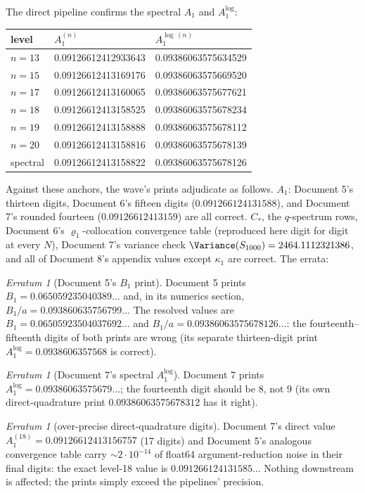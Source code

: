 \documentclass[11pt,oneside]{article}
\theoremstyle{definition}
\theoremstyle{remark}
\newtheorem{erratum}[theorem]{Erratum}
\begin{document}
The direct pipeline confirms the spectral $A_1$ and $A_1^{\log}$:
\begin{center}
\small
\begin{tabular}{@{}lll@{}}
\toprule
level & $A_1^{(n)}$ & $A_1^{\log\,(n)}$ \\
\midrule
$n=13$ & 0.09126612412933643 & 0.09386063575634529 \\
$n=15$ & 0.09126612413169176 & 0.09386063575669520 \\
$n=17$ & 0.09126612413160065 & 0.09386063575677621 \\
$n=18$ & 0.09126612413158525 & 0.09386063575678234 \\
$n=19$ & 0.09126612413158888 & 0.09386063575678112 \\
$n=20$ & 0.09126612413158816 & 0.09386063575678139 \\
spectral & 0.09126612413158822 & 0.09386063575678126 \\
\bottomrule
\end{tabular}
\end{center}

Against these anchors, the wave's prints adjudicate as follows.
$A_1$: Document 5's thirteen digits, Document 6's fifteen digits
($0.091266124131588$), and Document 7's rounded fourteen
($0.09126612413159$) are all correct.  $C_*$, the $q$-spectrum rows,
Document 6's $\varrho_1$-collocation convergence table (reproduced here
digit for digit at every $N$), Document 7's variance check
$\Variance(S_{1000})=2464.1112321386$, and all of Document 8's appendix
values except $\kappa_1$ are correct.  The errata:

\begin{erratum}[Document 5's $B_1$ print]
\label{err:doc5-B1}
Document 5 prints $B_1=0.065059235040389\ldots$ and, in its numerics
section, $B_1/a=0.093860635756799\ldots$  The resolved values are
$B_1=0.06505923504037692\ldots$ and $B_1/a=0.09386063575678126\ldots$:
the fourteenth--fifteenth digits of both prints are wrong (its separate
thirteen-digit print $A_1^{\log}=0.0938606357568$ is correct).
\end{erratum}

\begin{erratum}[Document 7's spectral $A_1^{\log}$]
\label{err:doc7-alog}
Document 7 prints $A_1^{\log}=0.09386063575679\ldots$; the fourteenth
digit should be $8$, not $9$ (its own direct-quadrature print
$0.09386063575678312$ has it right).
\end{erratum}

\begin{erratum}[over-precise direct-quadrature digits]
\label{err:doc7-direct}
Document 7's direct value $A_1^{(18)}=0.09126612413156757$ (17 digits)
and Document 5's analogous convergence table carry $\sim\!2\cdot10^{-14}$
of float64 argument-reduction noise in their final digits: the exact
level-18 value is $0.091266124131585\ldots$  Nothing downstream is
affected; the prints simply exceed the pipelines' precision.
\end{erratum}
\end{document}
